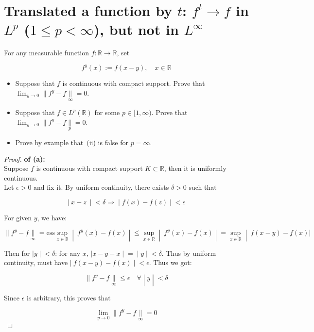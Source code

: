 \documentclass{qlnotes-export}
\begin{document}
\section{\texorpdfstring{Translated a function by \(t\): \(f^{t}\rightarrow f\) in \(L^{p}\) (\(1 \leq p < \infty\)), but not in \(L^{\infty}\)}{Translated a function by t: f\^{}\{t\}\textbackslash rightarrow f in L\^{}\{p\} (1 \textbackslash leq p \textless{} \textbackslash infty), but not in L\^{}\{\textbackslash infty\}}}\label{translated-a-function-by-t-ft-to-f-in-lp-1leq-p-infty-but-not-in-linfty}

For any measurable function \(f:{\mathbb{R}}\rightarrow{\mathbb{R}}\), set

\[f^{y}(x) := f(x - y),\quad x \in {\mathbb{R}}\]

\begin{itemize}
\item
  Suppose that \(f\) is continuous with compact support. Prove that \(\lim_{y\rightarrow 0} \parallel f^{y} - f\underset{\infty}{\parallel} = 0\).
\item
  Suppose that \(f \in L^{p}({\mathbb{R}})\) for some \(p \in \lbrack 1,\infty)\). Prove that \(\lim_{y\rightarrow 0} \parallel f^{y} - f\underset{p}{\parallel} = 0\).
\item
  Prove by example that~(ii) is false for \(p = \infty\).
\end{itemize}

\begin{proof}

\textbf{of (a):}\\
Suppose \(f\) is continuous with compact support \(K \subset {\mathbb{R}}\), then it is uniformly continuous.\\
Let \(\epsilon > 0\) and fix it. By uniform continuity, there exists \(\delta > 0\) such that

\[\left. |\ x - z\  \middle| < \delta\Longrightarrow \middle| f(x) - f(z) \middle| < \epsilon \right.\]

For given \(y\), we have:

\[\left. \parallel f^{y} - f\underset{\infty}{\parallel} = \text{ess}\sup\limits_{x \in {\mathbb{R}}} \middle| \ f^{y}(x) - f(x) \middle| \leq \sup\limits_{x \in {\mathbb{R}}} \middle| \ f^{y}(x) - f(x) \middle| = \sup\limits_{x \in {\mathbb{R}}} \middle| \ f(x - y) - f(x)| \right.\]

Then for \(\left. |y \middle| < \delta \right.\): for any \(x\), \(\left. |x - y - x \middle| = \middle| y \middle| < \delta \right.\). Thus by uniform continuity, must have \(\left. |\ f(x - y) - f(x) \middle| < \epsilon \right.\). Thus we got:

\[\left. \parallel f^{y} - f\underset{\infty}{\parallel} \leq \epsilon\quad\forall \middle| y \middle| < \delta \right.\]

Since \(\epsilon\) is arbitrary, this proves that

\[\lim\limits_{y\rightarrow 0} \parallel f^{y} - f\underset{\infty}{\parallel} = 0\]

\end{proof}
\end{document}
